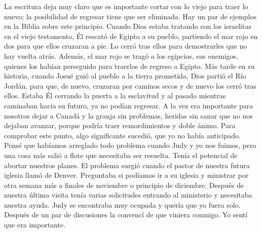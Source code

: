 \documentclass[twoside, 12pt]{book}
\begin{document}
La escritura deja muy claro que es importante cortar con lo viejo para traer lo nuevo; la posibilidad de regresar tiene que ser eliminada. Hay un par de ejemplos en la Biblia sobre este principio. Cuando Dios estaba tratando con los israelitas en el viejo testamento, Él rescató de Egipto a su pueblo, partiendo el mar rojo en dos para que ellos cruzaran a pie. Lo cerró tras ellos para demostrarles que no hay vuelta atrás. Además, el mar rojo se tragó a los egipcios, sus enemigos, quienes los habían perseguido para traerlos de regreso a Egipto. Más tarde en su historia, cuando Josué guió al pueblo a la tierra prometida, Dios partió el Río Jordán, para que, de nuevo, cruzaran por caminos secos y de nuevo los cerró tras ellos. Estaba Él cerrando la puerta a la esclavitud y al pasado mientras caminaban hacia su futuro, ya no podían regresar.
A la vez era importante para nosotros dejar a Canadá y la granja sin problemas, heridas sin sanar que no nos dejaban avanzar, porque podría traer remordimientos y doble ánimo. Para comprobar este punto, algo significante sucedió, que yo no había anticipado. Pensé que habíamos arreglado todo problema cuando Judy y yo nos fuimos, pero una cosa más salió a flote que necesitaba ser resuelta. Tenía el potencial de abortar nuestros planes. El problema surgió cuando el pastor de nuestra futura iglesia llamó de Denver. Preguntaba si podíamos ir a su iglesia y ministrar por otra semana más a finales de noviembre o principio de diciembre. Después de nuestra última visita tenía varias solicitudes entrando al ministerio y necesitaba nuestra ayuda.  Judy se encontraba muy ocupada y quería que yo fuera solo. Después de un par de discusiones la convencí de que viniera conmigo. Yo sentí que era importante.\\
\end{document}
